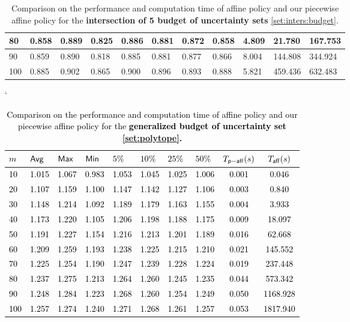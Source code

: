 \documentclass[11pt]{article}
\theoremstyle{plain}
\theoremstyle{definition}
\numberwithin{equation}{section}%
\numberwithin{equation}{section}%
\newcommand*{\red}{\textcolor{black}}
\begin{document}
\begin{table}[]
{\begin{tabular}{|l|l|l|l|l|l|l|l|l|l|l|}
80  & 0.858 & 0.889 & 0.825 & 0.886 & 0.881 & 0.872 & 0.858 & 4.809 & 21.780  & 167.753 \\\hline
90  & 0.859 & 0.890 & 0.818 & 0.885 & 0.881 & 0.877 & 0.866 & 8.004 & 144.808 & 344.924 \\\hline
100 & 0.885 & 0.902 & 0.865 & 0.900 & 0.896 & 0.893 & 0.888 & 5.821 & 459.436 & 632.483 \\\hline
\end{tabular}%
\caption{Comparison on the performance and computation time of affine policy and our piecewise affine policy for the {\bf intersection of 5 budget of uncertainty sets}  \eqref{set:inters:budget}.}
\label{tab:simu:5bud}}
\end{table}`

\begin{table}[]
\red{
\centering
\begin{tabular}{|l|l|l|l|l|l|l|l|c|c|}
\hline
$m$ & ${\sf Avg}$ &  ${\sf Max}$& ${\sf Min}$ &   $5\%$ & $10\%$ &  $25\%$  & $50\%$  & $T_{\sf p-aff}(s)$ & $T_{\sf aff}(s)$\\ \hline
10  & 1.015 & 1.067 & 0.983 & 1.053 & 1.045 & 1.025 & 1.006 & 0.001 & 0.046    \\\hline
20  & 1.107 & 1.159 & 1.100 & 1.147 & 1.142 & 1.127 & 1.106 & 0.003 & 0.840    \\\hline
30  & 1.148 & 1.214 & 1.092 & 1.189 & 1.179 & 1.163 & 1.155 & 0.004 & 3.933    \\\hline
40  & 1.173 & 1.220 & 1.105 & 1.206 & 1.198 & 1.188 & 1.175 & 0.009 & 18.097   \\\hline
50  & 1.191 & 1.227 & 1.154 & 1.216 & 1.213 & 1.201 & 1.189 & 0.016 & 62.668   \\\hline
60  & 1.209 & 1.259 & 1.193 & 1.238 & 1.225 & 1.215 & 1.210 & 0.021 & 145.552  \\\hline
70  & 1.225 & 1.254 & 1.190 & 1.247 & 1.239 & 1.228 & 1.224 & 0.019 & 237.448  \\\hline
80  & 1.237 & 1.275 & 1.213 & 1.264 & 1.260 & 1.245 & 1.235 & 0.044 & 573.342  \\\hline
90  & 1.248 & 1.284 & 1.223 & 1.268 & 1.260 & 1.254 & 1.249 & 0.050 & 1168.928 \\\hline
100 & 1.257 & 1.274 & 1.240 & 1.271 & 1.268 & 1.261 & 1.257 & 0.053 & 1817.940\\\hline
\end{tabular}%
\caption{Comparison on the performance and computation time of affine policy and our piecewise affine policy for the {\bf generalized budget of uncertainty set \eqref{set:polytope}.}}
\label{tab:simu:genpoly}}
\end{table}
\end{document}
